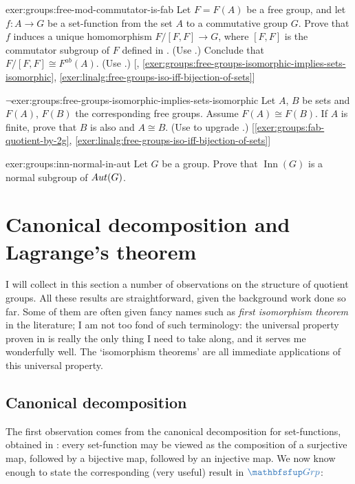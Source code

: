 \begin{exer}{\exerused}{exer:groups:free-mod-commutator-is-fab}
  Let $F = F(A)$ be a free group, and let $f : A \to G$ be a
  set-function from the set $A$ to a commutative group $G$. Prove that
  $f$ induces a unique homomorphism $F/[F,F] \to G$, where $[F,F]$ is
  the commutator subgroup of $F$ defined in
  . (Use
  .) Conclude that
  $F/[F,F] \cong F^{ab}(A)$. (Use
  .)
  [,
  \ref{exer:groups:free-groups-isomorphic-implies-sets-isomorphic},
  \ref{exer:linalg:free-groups-iso-iff-bijection-of-sets}]
\end{exer}
\begin{exer}{$\lnot$}{exer:groups:free-groups-isomorphic-implies-sets-isomorphic}
  Let $A$, $B$ be sets and $F(A)$, $F(B)$ the corresponding free
  groups.  Assume $F(A) \cong F(B)$. If $A$ is finite, prove that $B$
  is also and $A \cong B$. (Use
   to upgrade
  .)
  [\ref{exer:groups:fab-quotient-by-2g},
  \ref{exer:linalg:free-groups-iso-iff-bijection-of-sets}]
\end{exer}
\begin{exer}{}{exer:groups:inn-normal-in-aut}
  Let $G$ be a group. Prove that $\operatorname{Inn}(G)$ is a normal
  subgroup of $Aut(G)$.
\end{exer}

\section{Canonical decomposition and Lagrange's theorem}
\label{sec:groups:canonical-decomposition-and-lagrange-s-theorem}

I will collect in this section a number of observations on the
structure of quotient groups. All these results are straightforward,
given the background work done so far. Some of them are often given
fancy names such as \emph{first isomorphism theorem} in the
literature; I am not too fond of such terminology: the universal
property proven in
 is really the
only thing I need to take along, and it serves me wonderfully
well. The `isomorphism theorems' are all immediate applications of
this universal property.

\subsection{Canonical decomposition}
\label{subsec:groups:canonical-decomposition}
The first observation comes from the canonical decomposition for
set-functions, obtained in
: every set-function
may be viewed as the composition of a surjective map, followed by a
bijective map, followed by an injective map. We now know enough to
state the corresponding (very useful) result in $\categ{Grp}$:

